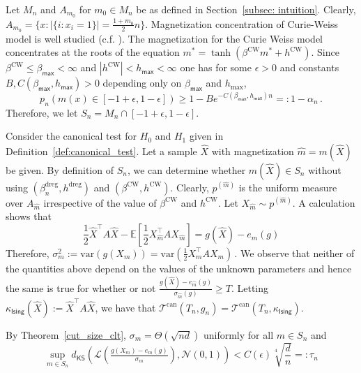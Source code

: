 \documentclass[final,12pt]{colt2018}
\begin{document}
Let $M_n$ and $A_{m_0}$ for $m_0 \in M_n$ be as defined in Section~\ref{subsec: intuition}. Clearly, $A_{m_0} = \{x: |\{i: x_i = 1\}| = \frac{1+m_0}{2}n\}$. Magnetization concentration of Curie-Weiss model is well studied (c.f. \citet{ellis2007entropy}). The magnetization for the Curie Weiss model concentrates at the roots of the equation $m^{*} = \tanh{(\beta^{\mathrm{CW}}m^{*} + h^{\mathrm{CW}})}$. Since $\beta^{\mathrm{CW}} \leq \beta_{\mathsf{max}}< \infty$ and $|h^{\mathrm{CW}}| < h_{\mathsf{max}} < \infty$ one has for some $\epsilon >0$ and constants $B, C(\beta_{\mathsf{max}},h_{\mathsf{max}}) > 0$  depending only on $\beta_{\mathsf{max}}$ and $h_{\max}$,
 $$p_n\left(m(x) \in [-1+\epsilon, 1-\epsilon]\right) \geq 1 - Be^{-C(\beta_{\mathsf{max}},h_{\mathsf{max}})n} =: 1-\alpha_n \,.$$  
Therefore, we let $S_n = M_n \cap [-1+\epsilon, 1-\epsilon]$.
 



\begin{remark}
Consider the canonical test for $H_0$ and $H_1$ given in Definition~\ref{def:canonical_test}. Let a sample $\hat{X}$ with magnetization $\hat{m} = m(\hat{X})$ be given.
By definition of $S_n$,  we can determine whether $m(\hat{X}) \in S_n $ without using $(\beta^{\mathrm{dreg}}_n,h^{\mathrm{dreg}})$ and $(\beta^{\mathrm{CW}},h^{\mathrm{CW}})$.
Clearly, $p^{(\hat{m})}$ is the uniform measure over $A_{\hat{m}}$ irrespective of the value of $\beta^{\mathrm{CW}}$ and $h^{\mathrm{CW}}$. Let $X_{\hat{m}} \sim p^{(\hat{m})}$.
 A calculation shows that
 $$\frac{1}{2}\hat{X}^{\intercal}A\hat{X}  - \mathbb{E}\left[\frac{1}{2}X_{\hat{m}}^{\intercal}AX_{\hat{m}}\right]= g(\hat{X}) - e_{\hat{m}}(g)$$
Therefore, $\sigma^2_m := \mathrm{var}(g(X_m)) =\mathrm{var}\left(\frac{1}{2}X_m^{\intercal}AX_m\right) \,.$ We observe that neither of the quantities above depend on the values of the unknown parameters and hence the same is true for whether or not $\frac{g(\hat{X}) - e_{\hat{m}}(g)}{\sigma_{\hat{m}}(g)} \geq T$. Letting $\kappa_{\mathsf{Ising}}(\hat{X}) := \hat{X}^{\intercal}A\hat{X}$, we have that $\mathcal{T}^{\mathrm{can}}(T_n,g_n) = \mathcal{T}^{\mathrm{can}}(T_n, \kappa_{\mathsf{Ising}})$. 
\label{rem:parameter_independence_ising}
\end{remark}




By Theorem~\ref{cut_size_clt}, $\sigma_m = \Theta(\sqrt{nd})$ uniformly for all $m \in S_n$ and $$\sup_{m \in S_n} d_{\mathsf{KS}}\left(\mathcal{L}\left(\tfrac{g(X_m) - e_m(g)}{\sigma_m}\right),\mathcal{N}(0,1)\right) <  C(\epsilon)\sqrt[4]{\frac{d}{n}} =: \tau_n$$
\end{document}
